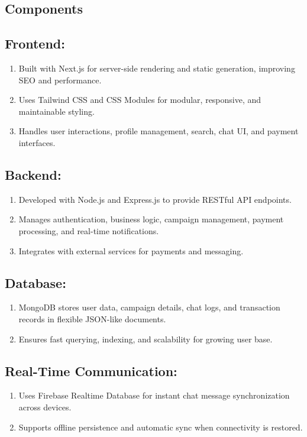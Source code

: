 \begin{justify}
\section{Components}
\subsection{Frontend:}
\begin{enumerate}
    \item Built with Next.js for server-side rendering and static generation, improving SEO and performance.
    \item Uses Tailwind CSS and CSS Modules for modular, responsive, and maintainable styling.
    \item Handles user interactions, profile management, search, chat UI, and payment interfaces.
\end{enumerate}
\subsection{Backend:}
\begin{enumerate}
    \item 	Developed with Node.js and Express.js to provide RESTful API endpoints.
    \item 	Manages authentication, business logic, campaign management, payment processing, and real-time notifications.
    \item 	Integrates with external services for payments and messaging.
\end{enumerate}
\subsection{Database:}
\begin{enumerate}
    \item MongoDB stores user data, campaign details, chat logs, and transaction records in flexible JSON-like documents.
    \item Ensures fast querying, indexing, and scalability for growing user base.
\end{enumerate}
\subsection{Real-Time Communication:}
\begin{enumerate}
    \item 	Uses Firebase Realtime Database for instant chat message synchronization across devices.
    \item 	Supports offline persistence and automatic sync when connectivity is restored.
\end{enumerate}

\end{justify}
